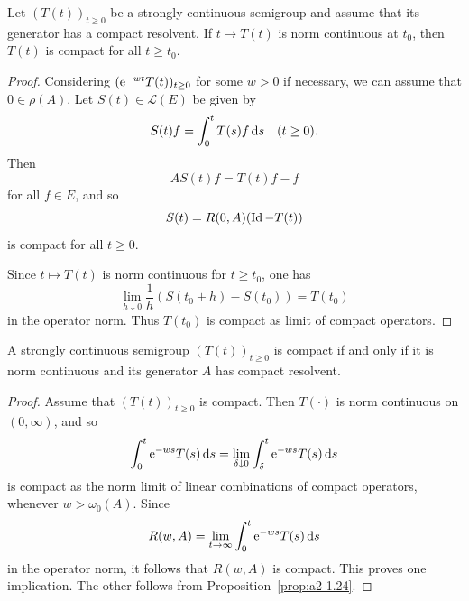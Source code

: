 \begin{proposition}\label{prop:a2-1.24}
Let $(T(t))_{t\geq 0}$ be a strongly continuous semigroup and assume that its generator has a compact resolvent.
If\/ $t \mapsto T(t)$ is norm continuous at $t_0$, then $T(t)$ is compact for all $t \geq t_0$.
\end{proposition}
\begin{proof}
Considering $(\eu^{-wt}T(t))_{t\geq 0}$ for some $w > 0$ if necessary, we can assume that $0 \in \rho(A)$.
Let $S(t) \in \mathcal{L}(E)$ be given by 
%
\[
	S(t)f = \int_0^t T(s)f \ds \quad (t \geq 0) .
\]
%
Then %
\[
	AS(t)f = T(t)f - f
\]
%
for all $f \in E$, and so 
%
\[
	S(t) = R(0,A)(\operatorname{Id}-T(t))
\]
%
is compact for all $t \geq 0$.

Since $t \mapsto T(t)$ is norm continuous for $t \geq t_0$, one has 
%
\[
	\lim_{h \downarrow 0} \frac{1}{h}(S(t_0+h)-S(t_0)) = T(t_0)
\]
%
in the operator norm.
Thus $T(t_0)$ is compact as limit of compact operators.
\end{proof}
\begin{theorem}\label{thm:a2-1.25}
A strongly continuous semigroup $(T(t))_{t\geq 0}$ is compact if and only if it is norm continuous and its generator $A$ has compact resolvent.
\end{theorem}
\begin{proof}
Assume that $(T(t))_{t\geq 0}$ is compact. Then $T(\cdot)$ is norm continuous on $(0,\infty)$, and so 
\[
    \int_{0}^{t} \mathrm{e}^{-ws} T(s) \mathop{}\!\mathrm{d}{s} = \lim_{\delta \downarrow 0} \int_{\delta}^{t} \mathrm{e}^{-ws} T(s) \mathop{}\!\mathrm{d}{s}
\]
is compact as the norm limit of linear combinations of compact operators, whenever $w > \omega_{0}(A)$.
Since 
\[
    R(w,A) = \lim_{t \to \infty} \int_{0}^{t} \mathrm{e}^{-ws} T(s) \mathop{}\!\mathrm{d}{s}
\]
in the operator norm, it follows that $R(w,A)$ is compact.
This proves one implication.
The other follows from Proposition~\ref{prop:a2-1.24}. 
\end{proof}
